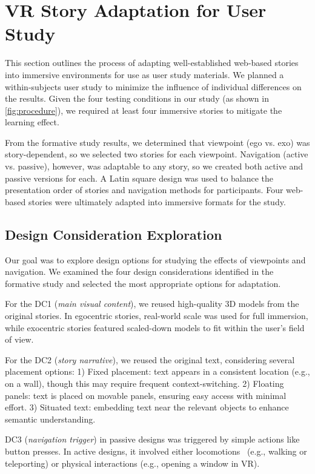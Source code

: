 \section{VR Story Adaptation for User Study}
\label{sec:adaptation}


This section outlines the process of adapting well-established web-based stories into immersive environments for use as user study materials. We planned a within-subjects user study to minimize the influence of individual differences on the results. Given the four testing conditions in our study (as shown in \autoref{fig:procedure}), we required at least four immersive stories to mitigate the learning effect.

From the formative study results, we determined that viewpoint (ego vs. exo) was story-dependent, so we selected two stories for each viewpoint. 
Navigation (active vs. passive), however, was adaptable to any story, so we created both active and passive versions for each. A Latin square design was used to balance the presentation order of stories and navigation methods for participants. Four web-based stories were ultimately adapted into immersive formats for the study.

\subsection{Design Consideration Exploration}

Our goal was to explore design options for studying the effects of viewpoints and navigation. We examined the four design considerations identified in the formative study and selected the most appropriate options for adaptation.

For the {DC1} (\textit{main visual content}), we reused high-quality 3D models from the original stories. In egocentric stories, real-world scale was used for full immersion, while exocentric stories featured scaled-down models to fit within the user's field of view.

For the {DC2} (\textit{story narrative}), we reused the original text, considering several placement options:
1) Fixed placement: text appears in a consistent location (e.g., on a wall), though this may require frequent context-switching.
2) Floating panels: text is placed on movable panels, ensuring easy access with minimal effort.
3) Situated text: embedding text near the relevant objects to enhance semantic understanding.

{DC3} (\textit{navigation trigger}) in passive designs was triggered by simple actions like button presses. In active designs, it involved either locomotions~\cite{di2021locomotion} (e.g., walking or teleporting) or physical interactions (e.g., opening a window in VR).

